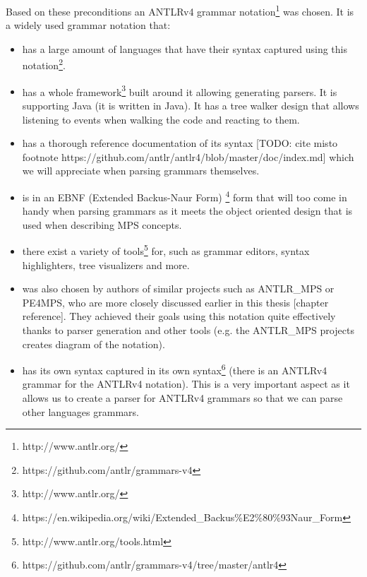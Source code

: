 Based on these preconditions an ANTLRv4 grammar notation\footnote{http://www.antlr.org/} was chosen. It is a widely used grammar notation that:

\begin{itemize}
	\item has a large amount of languages that have their syntax captured using this notation\footnote{https://github.com/antlr/grammars-v4}.

	\item has a whole framework\footnote{http://www.antlr.org/} built around it allowing generating parsers. It is supporting Java (it is written in Java). It has a tree walker design that allows listening to events when walking the code and reacting to them.

	\item has a thorough reference documentation of its syntax [TODO: cite misto footnote https://github.com/antlr/antlr4/blob/master/doc/index.md] which we will appreciate when parsing grammars themselves.
	
	\item is in an EBNF (Extended Backus-Naur Form) \footnote{https://en.wikipedia.org/wiki/Extended{\_}Backus\%E2\%80\%93Naur{\_}Form} form that will too come in handy when parsing grammars as it meets the object oriented design that is used when describing MPS concepts.
	
	\item there exist a variety of tools\footnote{http://www.antlr.org/tools.html} for, such as grammar editors, syntax highlighters, tree visualizers and more.
	
	\item was also chosen by authors of similar projects such as ANTLR{\_}MPS or PE4MPS, who are more closely discussed earlier in this thesis [chapter reference]. They achieved their goals using this notation quite effectively thanks to parser generation and other tools (e.g. the ANTLR{\_}MPS projects creates diagram of the notation).
	
	\item has its own syntax captured in its own syntax\footnote{https://github.com/antlr/grammars-v4/tree/master/antlr4} (there is an ANTLRv4 grammar for the ANTLRv4 notation). This is a very important aspect as it allows us to create a parser for ANTLRv4 grammars so that we can parse other languages grammars.
\end{itemize}